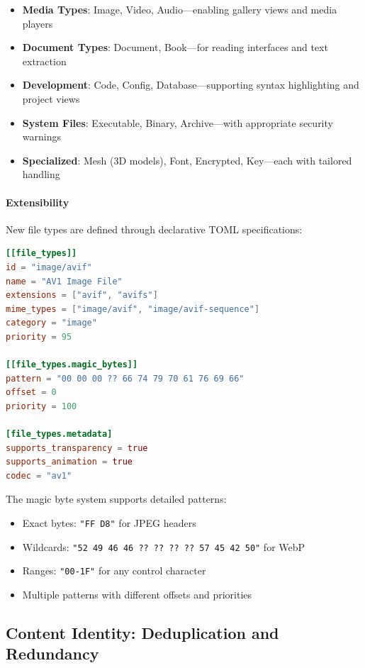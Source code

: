 \documentclass[sigconf]{acmart}
\begin{document}
\begin{itemize}
    \item \textbf{Media Types}: Image, Video, Audio—enabling gallery views and media players
    \item \textbf{Document Types}: Document, Book—for reading interfaces and text extraction
    \item \textbf{Development}: Code, Config, Database—supporting syntax highlighting and project views
    \item \textbf{System Files}: Executable, Binary, Archive—with appropriate security warnings
    \item \textbf{Specialized}: Mesh (3D models), Font, Encrypted, Key—each with tailored handling
\end{itemize}

\paragraph{Extensibility}
New file types are defined through declarative TOML specifications:

\begin{lstlisting}[language=toml, caption=Example file type definition for AVIF images]
[[file_types]]
id = "image/avif"
name = "AV1 Image File"
extensions = ["avif", "avifs"]
mime_types = ["image/avif", "image/avif-sequence"]
category = "image"
priority = 95

[[file_types.magic_bytes]]
pattern = "00 00 00 ?? 66 74 79 70 61 76 69 66"
offset = 0
priority = 100

[file_types.metadata]
supports_transparency = true
supports_animation = true
codec = "av1"
\end{lstlisting}

The magic byte system supports detailed patterns:
\begin{itemize}
    \item Exact bytes: \texttt{"FF D8"} for JPEG headers
    \item Wildcards: \texttt{"52 49 46 46 ?? ?? ?? ?? 57 45 42 50"} for WebP
    \item Ranges: \texttt{"00-1F"} for any control character
    \item Multiple patterns with different offsets and priorities
\end{itemize}

\subsection{Content Identity: Deduplication and Redundancy}
\label{sec:content-identity}
\end{document}
